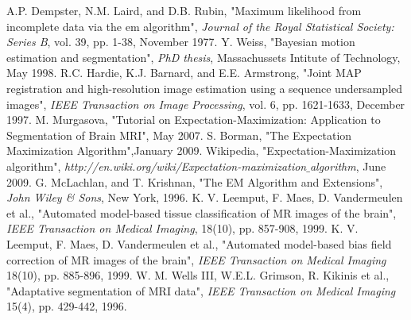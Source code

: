 \begin{thebibliography}{9999}%
%
A.P. Dempster, N.M. Laird, and D.B. Rubin, "Maximum likelihood from incomplete data via the em algorithm", \textsl{Journal of the Royal Statistical Society: Series B}, vol. 39, pp. 1-38, November 1977.
%
Y. Weiss, "Bayesian motion estimation and segmentation", \textsl{PhD thesis}, Massachussets Intitute of Technology, May 1998.
%
R.C. Hardie, K.J. Barnard, and E.E. Armstrong, "Joint MAP registration and high-resolution image estimation using a sequence undersampled images", \textsl{IEEE Transaction on Image Processing}, vol. 6, pp. 1621-1633, December 1997.
%
M. Murgasova, "Tutorial on Expectation-Maximization: Application to Segmentation of Brain MRI", May 2007.
%
S. Borman, "The Expectation Maximization Algorithm",January 2009.
%
Wikipedia, "Expectation-Maximization algorithm", \textsl{http://en.wiki.org/wiki/Expectation-maximization$\_$algorithm}, June 2009.
%
G. McLachlan, and T. Krishnan, "The EM Algorithm and Extensions", \textsl{John Wiley \& Sons}, New York, 1996.
%
K. V. Leemput, F. Maes, D. Vandermeulen et al., "Automated model-based tissue classification of MR images of the brain", \textsl{IEEE Transaction on Medical Imaging}, 18(10), pp. 857-908, 1999.
%
K. V. Leemput, F. Maes, D. Vandermeulen et al., "Automated model-based bias field correction of MR images of the brain", \textsl{IEEE Transaction on Medical Imaging} 18(10), pp. 885-896, 1999.
%
W. M. Wells III, W.E.L. Grimson, R. Kikinis et al., "Adaptative segmentation of MRI data", \textsl{IEEE Transaction on Medical Imaging} 15(4), pp. 429-442, 1996.

%
\end{thebibliography}
